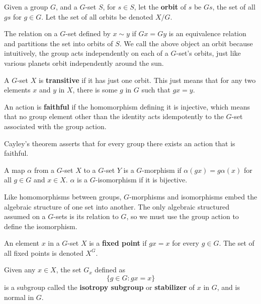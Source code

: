 \begin{definition}
Given a group $G$, and a $G$-set $S$, for $s \in S$, let the {\bf orbit}  of $s$ be $Gs$, the set of all $gs$ for $g \in G$. Let the set of all orbits be denoted $X/G$.
\end{definition}

The relation on a $G$-set defined by $x \sim y$ if $Gx = Gy$ is an equivalence relation and partitions the set into orbits of $S$. We call the above object an orbit because intuitively, the group acts independently on each of a $G$-set's orbits, just like various planets orbit independently around the sun.

\begin{definition}
    A $G$-set $X$ is {\bf transitive}  if it has just one orbit. This just means that for any two elements $x$ and $y$ in $X$, there is some $g$ in $G$ such that $gx = y$.
\end{definition}

\begin{definition}
    An action is {\bf faithful}  if the homomorphism defining it is injective, which means that no group element other than the identity acts idempotently to the $G$-set associated with the group action.
\end{definition}

Cayley's theorem asserts that for every group there exists an action that is faithful.

\begin{definition}
    A map $\alpha$ from a  $G$-set $X$ to a $G$-set $Y$ is a $G$-morphism  if $\alpha(gx) = g\alpha(x)$ for all $g \in G$ and $x \in X$. $\alpha$ is a $G$-isomorphism if it is bijective.
\end{definition}

Like homomorphisms between groups, $G$-morphisms and isomorphisms embed the algebraic structure of one set into another. The only algebraic structured assumed on a $G$-sets is its relation to $G$, so we must use the group action to define the isomorphism.

\begin{definition}
    An element $x$ in a $G$-set $X$ is a {\bf fixed point}  if $gx = x$ for every $g \in G$. The set of all fixed points is denoted $X^G$.
\end{definition}

\begin{definition}
    Given any $x \in X$, the set $G_x$ defined as
    \[ \{ g \in G : gx = x \} \]
    is a subgroup called the {\bf isotropy subgroup}  or {\bf stabilizer}  of $x$ in $G$, and is normal in $G$.
\end{definition}

